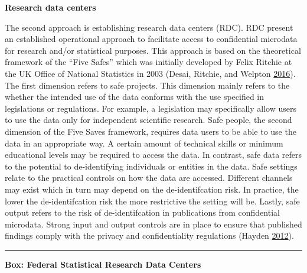 \documentclass[]{krantz}
\begin{document}
\textbf{Research data centers}

The second approach is establishing research data centers (RDC). RDC
present an established operational approach to facilitate access to
confidential microdata for research and/or statistical purposes. This
approach is based on the theoretical framework of the ``Five Safes''
which was initially developed by Felix Ritchie at the UK Office of
National Statistics in 2003 (Desai, Ritchie, and Welpton
\protect\hyperlink{ref-desaietal2016}{2016}). The first dimension refers
to safe projects. This dimension mainly refers to the whether the
intended use of the data conforms with the use specified in legislations
or regulations. For example, a legislation may specifically allow users
to use the data only for independent scientific research. Safe people,
the second dimension of the Five Saves framework, requires data users to
be able to use the data in an appropriate way. A certain amount of
technical skills or minimum educational levels may be required to access
the data. In contrast, safe data refers to the potential to
de-identifying individuals or entities in the data. Safe settings relate
to the practical controls on how the data are accessed. Different
channels may exist which in turn may depend on the de-identifcation
risk. In practice, the lower the de-identifcation risk the more
restrictive the setting will be. Lastly, safe output refers to the risk
of de-identifcation in publications from confidential microdata. Strong
input and output controls are in place to ensure that published findings
comply with the privacy and confidentiality regulations (Hayden
\protect\hyperlink{ref-hayden2012broken}{2012}).

\begin{center}\rule{0.5\linewidth}{\linethickness}\end{center}

\textbf{Box: Federal Statistical Research Data Centers}
\end{document}
